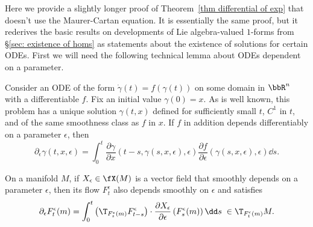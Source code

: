 Here we provide a slightly longer proof of Theorem~\ref{thm differential of exp} that doesn't use the Maurer-Cartan equation. It is essentially the same proof, but it rederives the basic results on developments of Lie algebra-valued $1$-forms from \S\ref{sec: existence of homs} as statements about the existence of solutions for certain ODEs. First we will need the following technical lemma about ODEs dependent on a parameter.
\begin{lem}\label{lem variation formula}
    Consider an ODE of the form $\dot \gamma(t)=f(\gamma(t))$ on some domain in $\bbR^n$ with a differentiable $f$. Fix an initial value $\gamma(0)=x$. As is well known, this problem has a unique solution $\gamma(t,x)$ defined for sufficiently small $t$, $C^1$ in $t$, and of the same smoothness class as $f$ in $x$. If $f$ in addition depends differentiably on a parameter $\epsilon$, then 
    \[\partial_\epsilon \gamma(t,x,\epsilon)=\int_0^t \frac{\partial \gamma}{\partial x}(t-s,\gamma(s,x,\epsilon),\epsilon)\frac{\partial f}{\partial\epsilon}(\gamma(s,x,\epsilon),\epsilon)\dd s.\]

    On a manifold $M$, if $X_\epsilon\in \fX(M)$ is a vector field that smoothly depends on a parameter $\epsilon$, then its flow $F^\epsilon_t$ also depends smoothly on $\epsilon$ and satisfies
    \[\partial_\epsilon F^\epsilon_t(m)=\int_0^t\left(\T_{F^\epsilon_s(m)}F^{\epsilon}_{t-s}\right)\cdot \frac{\partial X_\epsilon}{\partial \epsilon}\left(F^\epsilon_s(m)\right)\dd s\; \in \T_{F^\epsilon_t(m)}M.\label{2702}\]
\end{lem}
